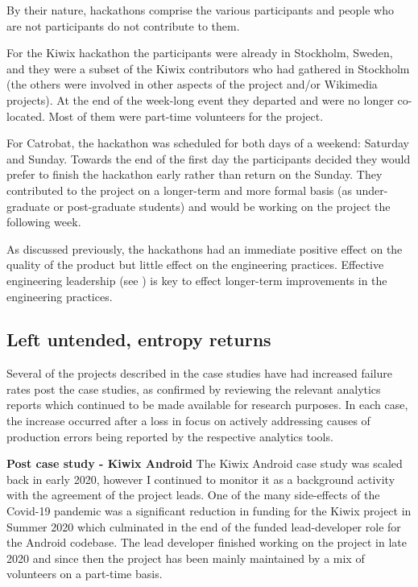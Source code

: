 By their nature, hackathons comprise the various participants and people who are not participants do not contribute to them. 

For the Kiwix hackathon the participants were already in Stockholm, Sweden, and they were a subset of the Kiwix contributors who had gathered in Stockholm (the others were involved in other aspects of the project and/or Wikimedia projects). At the end of the week-long event they departed and were no longer co-located. Most of them were part-time volunteers for the project.  

For Catrobat, the hackathon was scheduled for both days of a weekend: Saturday and Sunday. Towards the end of the first day the participants decided they would prefer to finish the hackathon early rather than return on the Sunday. They contributed to the project on a longer-term and more formal basis (as under-graduate or post-graduate students) and would be working on the project the following week.

As discussed previously, the hackathons had an immediate positive effect on the quality of the product but little effect on the engineering practices. Effective engineering leadership (see ) is key to effect longer-term improvements in the engineering practices.

\subsection{Left untended, entropy returns}
Several of the projects described in the case studies have had increased failure rates post the case studies, as confirmed by reviewing the relevant analytics reports which continued to be made available for research purposes. In each case, the increase occurred after a loss in focus on actively addressing causes of production errors being reported by the respective analytics tools.

\textbf{Post case study - Kiwix Android}
The Kiwix Android case study was scaled back in early 2020, however I continued to monitor it as a background activity with the agreement of the project leads. One of the many side-effects of the Covid-19 pandemic was a significant reduction in funding for the Kiwix project in Summer 2020 which culminated in the end of the funded lead-developer role for the Android codebase. The lead developer finished working on the project in late 2020 and since then the project has been mainly maintained by a mix of volunteers on a part-time basis. 

